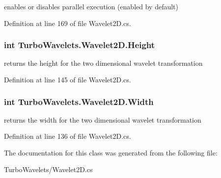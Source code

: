 enables or disables parallel execution (enabled by default) 



\-Definition at line 169 of file \-Wavelet2\-D.\-cs.

\hypertarget{class_turbo_wavelets_1_1_wavelet2_d_a277d0f89d73f839350c64a83ccd76ff6}{
\subsubsection[{\-Height}]{\setlength{\rightskip}{0pt plus 5cm}int {\bf \-Turbo\-Wavelets.\-Wavelet2\-D.\-Height}}}\label{class_turbo_wavelets_1_1_wavelet2_d_a277d0f89d73f839350c64a83ccd76ff6}


returns the height for the two dimensional wavelet transformation 



\-Definition at line 145 of file \-Wavelet2\-D.\-cs.

\hypertarget{class_turbo_wavelets_1_1_wavelet2_d_a30058c5e0e5bd95b29bc080efbcf9083}{
\subsubsection[{\-Width}]{\setlength{\rightskip}{0pt plus 5cm}int {\bf \-Turbo\-Wavelets.\-Wavelet2\-D.\-Width}}}\label{class_turbo_wavelets_1_1_wavelet2_d_a30058c5e0e5bd95b29bc080efbcf9083}


returns the width for the two dimensional wavelet transformation 



\-Definition at line 136 of file \-Wavelet2\-D.\-cs.



\-The documentation for this class was generated from the following file\-:\begin{DoxyCompactItemize}
\item 
\-Turbo\-Wavelets/\-Wavelet2\-D.\-cs\end{DoxyCompactItemize}
